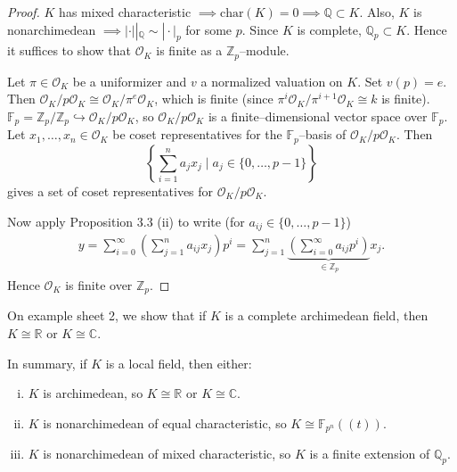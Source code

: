\documentclass{article}
\theoremstyle{definition}
\begin{document}
\begin{proof}
    $K$ has mixed characteristic $\implies \text{char}(K) = 0 \implies \mathbb{Q} \subset K$. Also, $K$ is nonarchimedean $\implies |\cdot| |_{\mathbb{Q}} \sim |\cdot|_p$ for some $p$. Since $K$ is complete, $\mathbb{Q}_p \subset K$. Hence it suffices to show that $\mathcal{O}_K$ is finite as a $\mathbb{Z}_p$--module.
    \vspace{1mm}
     
    Let $\pi \in \mathcal{O}_K$ be a uniformizer and $v$ a normalized valuation on $K$. Set $v(p) = e$. Then $\mathcal{O}_K/p \mathcal{O}_K \cong \mathcal{O}_K/\pi^e \mathcal{O}_K$, which is finite (since $\pi^i \mathcal{O}_K/\pi^{i+1}\mathcal{O}_K \cong k$ is finite). $\mathbb{F}_p = \mathbb{Z}_p/ \mathbb{Z}_p \hookrightarrow \mathcal{O}_K/p\mathcal{O}_K$, so $\mathcal{O}_K/p \mathcal{O}_K$ is a finite--dimensional vector space over $\mathbb{F}_p$. Let $x_1,\ldots,x_n \in \mathcal{O}_K$ be coset representatives for the $\mathbb{F}_p$--basis of $\mathcal{O}_K/p \mathcal{O}_K$. Then \[
    \left\{\sum_{i=1}^{n} a_j x_j \mid a_j \in \{0,\ldots,p-1\}\right\}
    \] gives a set of coset representatives for $\mathcal{O}_K/p\mathcal{O}_K$.
    \vspace{1mm}
     
    Now apply Proposition 3.3 (ii) to write (for $a_{ij} \in \{0,\ldots,p-1\}$)
    \begin{align*}
        y = \sum_{i=0}^{\infty} \left(\sum_{j=1}^{n} a_{ij}x_j \right)p^i = \sum_{j=1}^{n} \underbrace{\left(\sum_{i=0}^{\infty} a_{ij}p^i \right)}_{\in \mathbb{Z}_p} x_j.
    \end{align*}
    Hence $\mathcal{O}_K$ is finite over $\mathbb{Z}_p$.
\end{proof}
On example sheet 2, we show that if $K$ is a complete archimedean field, then $K \cong \mathbb{R}$ or $K \cong \mathbb{C}$.
\vspace{1mm}
 
In summary, if $K$ is a local field, then either:
\begin{enumerate}[(i)]
    \item $K$ is archimedean, so $K \cong \mathbb{R}$ or $K \cong \mathbb{C}$.
    \item $K$ is nonarchimedean of equal characteristic, so $K \cong \mathbb{F}_{p^n}((t))$.
    \item $K$ is nonarchimedean of mixed characteristic, so $K$ is a finite extension of $\mathbb{Q}_p$.
\end{enumerate}
\end{document}
